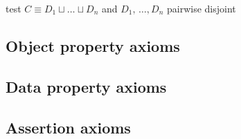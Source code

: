 \documentclass[paper.tex]{subfiles}
\begin{document}
\begin{algorithm}[H]
  \caption{test $C \equiv D_1 \sqcup \ldots \sqcup D_n$ and $D_1, \,\ldots, D_n$ pairwise disjoint}
  \begin{algorithmic}[1]
    \EndFunction
  \end{algorithmic}
\end{algorithm}

\subsection{Object property axioms}
\subsection{Data property axioms}
\subsection{Assertion axioms}
\end{document}
